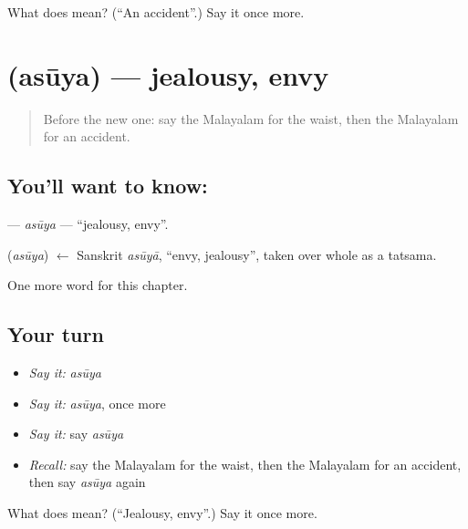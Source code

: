 \begin{tcolorbox}[breakable,colback=teal!4,colframe=teal!35!black,title={Before you move on}]
What does  mean? (\textquotedblleft{}An accident\textquotedblright{}.) Say it once more.
\end{tcolorbox}
\section[\texorpdfstring{\ml{അസൂയ} (asūya)}{അസൂയ (asūya)}]{ (asūya) — jealousy, envy}

\label{lesson:ML-C193-asuya}



\begin{quote}
Before the new one: say the Malayalam for the waist, then the Malayalam for an accident.
\end{quote}

\subsection*{You'll want to know: }
\textbf{} — \emph{asūya} — \textquotedblleft{}jealousy, envy\textquotedblright{}.

\begin{cousinweb}
\textbf{} (\emph{asūya}) $\leftarrow$ Sanskrit \emph{asūyā}, \textquotedblleft{}envy, jealousy\textquotedblright{}, taken over whole as a tatsama.
\end{cousinweb}

\begin{grammarlens}[title={What you've built}]
One more word for this chapter.
\end{grammarlens}

\subsection*{Your turn}
\begin{itemize}
\raggedright
  \item \emph{Say it:} \emph{asūya}
  \item \emph{Say it:} \emph{asūya}, once more
  \item \emph{Say it:} say \emph{asūya}
  \item \emph{Recall:} say the Malayalam for the waist, then the Malayalam for an accident, then say \emph{asūya} again
\end{itemize}

\begin{tcolorbox}[breakable,colback=teal!4,colframe=teal!35!black,title={Before you move on}]
What does  mean? (\textquotedblleft{}Jealousy, envy\textquotedblright{}.) Say it once more.
\end{tcolorbox}
